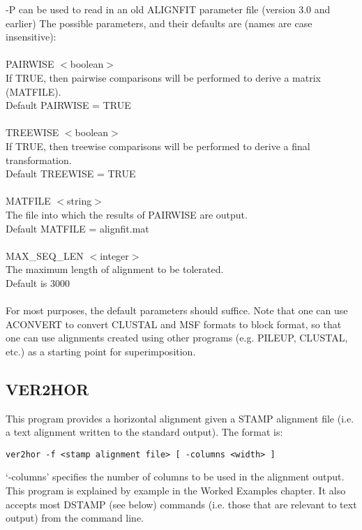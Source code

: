-P can be used to read in an old ALIGNFIT parameter file (version 3.0 and earlier)
The possible parameters, and their defaults are (names are case 
insensitive):\\
\\
PAIRWISE $<$boolean$>$\\
If TRUE, then pairwise comparisons will be performed to derive a
matrix (MATFILE).\\
Default PAIRWISE = TRUE\\
\\
TREEWISE $<$boolean$>$\\
If TRUE, then treewise comparisons will be performed to derive a
final transformation.\\
Default TREEWISE = TRUE\\
\\
MATFILE $<$string$>$\\
The file into which the results of PAIRWISE are output.\\
Default MATFILE = alignfit.mat\\
\\
MAX\_SEQ\_LEN $<$integer$>$\\
The maximum length of alignment to be tolerated.\\
Default is 3000\\
\\
For most purposes, the default parameters should suffice.  Note that one can
use ACONVERT to convert CLUSTAL and MSF formats to block format, so that one can use alignments created
using other programs (e.g. PILEUP, CLUSTAL, etc.) as a starting point for superimposition.

\subsection{VER2HOR}

This program provides a horizontal alignment given a STAMP alignment file
(i.e. a text alignment written to the standard output).  The format is:

\begin{scriptsize}\begin{verbatim}
ver2hor -f <stamp alignment file> [ -columns <width> ]
\end{verbatim} \end{scriptsize}

`-columns' specifies the number of columns to be used in the alignment output.  This
program is explained by example in the Worked Examples chapter.  It also accepts 
most DSTAMP (see below) commands (i.e. those that are relevant to text output) from
the command line.



